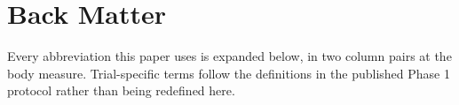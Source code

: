%
%
\section*{Back Matter}


Every abbreviation this paper uses is expanded below, in two column pairs at the
body measure. Trial-specific terms follow the definitions in the published Phase
1 protocol rather than being redefined here.

